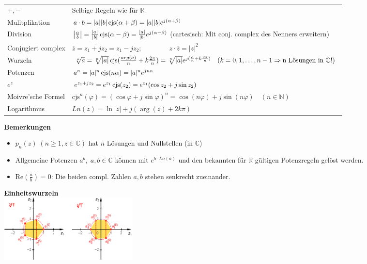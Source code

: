 \begin{tabular}{ll}
$+, -$
&Selbige Regeln wie für $\mathbb{R}$\\

Mulitplikation
&$a \cdot b = 
|a| |b| \operatorname{cjs}(\alpha + \beta) = 
|a| |b| e^{j(\alpha + \beta)}$\\

Division
&$\left|\frac{a}{b}\right| = 
\frac{\left|a\right|}{\left|b\right|} \operatorname{cjs}(\alpha - \beta) =
\frac{\left|a\right|}{\left|b\right|} e^{j(\alpha - \beta)}$ (cartesisch: Mit
conj. complex des Nenners erweitern) \\

Conjugiert complex
&$\overline{z} = \overline{z_1 + jz_2} = z_1 - jz_2; \qquad \qquad z \cdot \overline{z} = |z|^2$\\

Wurzeln
&$\sqrt[n]{a} = \sqrt[n]{|a|} \operatorname{cjs}(\frac{arg(a)}{n}+k\frac{2\pi}{n}) = 
\sqrt[n]{|a|} e^{j(\frac{\alpha}{n} + k \frac{2\pi}{n})} \quad (k = 0, 1,
\ldots, n-1 \Rightarrow \text{n Lösungen in } \mathbb{C} !)$ \\

Potenzen
&$a^n = |a|^n \operatorname{cjs}(n\alpha) = 
|a|^n e^{jn\alpha}$\\

$e^z$ &$e^{z_1+jz_2} = e^{z_1} \operatorname{cjs}(z_2) = e^{z_1} (\cos{z_2} + j\sin{z_2})$\\

Moivre'sche Formel
&$\text{cjs}^n(\varphi) =
(\cos{\varphi} + j\sin{\varphi})^n = 
\cos(n\varphi) +j\sin(n\varphi) \quad (n \in \mathbb{N})$\\

Logarithmus
&$Ln(z) = \ln{|z|} + j (\arg(z) + 2k \pi)$
\end{tabular}

\begin{minipage}[t]{11.4cm}
	\textbf{Bemerkungen}\\
	\begin{itemize}
	  \item $p_n(z) \; (n \geq 1, z \in \mathbb{C})$ hat $n$ Lösungen und Nullstellen (in
	$\mathbb{C}$)  
	  \item Allgemeine Potenzen $a^b,\;a,b \in \mathbb{C}$ können mit $e^{b \cdot 
	  Ln(a)}$ und den bekannten für $\mathbb{R}$ gültigen Potenzregeln gelöst
	  werden.
	  \item Re$\left (\frac{a}{b} \right) = 0$: Die beiden compl. Zahlen $a, b$
	  stehen senkrecht zueinander.
	\end{itemize}
\end{minipage}
\begin{minipage}[t]{7.4cm}
	\textbf{Einheitswurzeln}\\
	\includegraphics[width=7cm]{./bilder/einheitswurzel.png}
\end{minipage}
